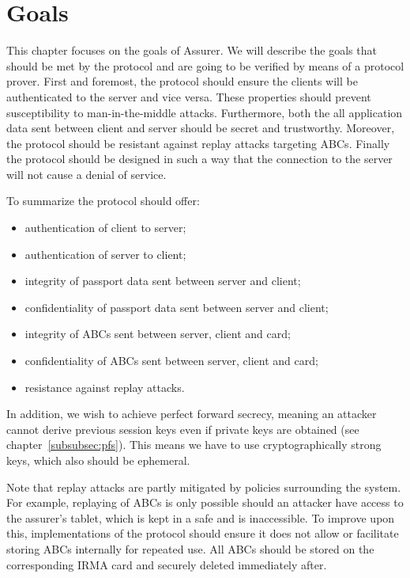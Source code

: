 \chapter{Goals}
\label{sec:goals}
This chapter focuses on the goals of Assurer. We will describe the goals that should be met by the protocol and are going to be verified by means of a protocol prover. First and foremost, the protocol should ensure the clients will be authenticated to the server and vice versa. These properties should prevent susceptibility to man-in-the-middle attacks. Furthermore, both the all application data sent between client and server should be secret and trustworthy. Moreover, the protocol should be resistant against replay attacks targeting ABCs. Finally the protocol should be designed in such a way that the connection to the server will not cause a denial of service.

To summarize the protocol should offer:
\begin{itemize}
  \item authentication of client to server;
  \item authentication of server to client;
  \item integrity of passport data sent between server and client;
  \item confidentiality of passport data sent between server and client;
  \item integrity of ABCs sent between server, client and card;
  \item confidentiality of ABCs sent between server, client and card;
  \item resistance against replay attacks.
\end{itemize}

In addition, we wish to achieve perfect forward secrecy, meaning an attacker cannot derive previous session keys even if private keys are obtained (see chapter~\ref{subsubsec:pfs}). This means we have to use cryptographically strong keys, which also should be ephemeral.

Note that replay attacks are partly mitigated by policies surrounding the system. For example, replaying of ABCs is only possible should an attacker have access to the assurer's tablet, which is kept in a safe and is inaccessible. To improve upon this, implementations of the protocol should ensure it does not allow or facilitate storing ABCs internally for repeated use. All ABCs should be stored on the corresponding IRMA card and securely deleted immediately after.

